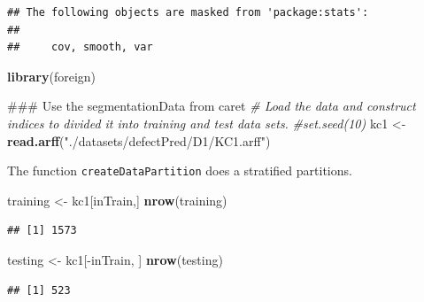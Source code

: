 \documentclass[]{book}
\newenvironment{Shaded}{\begin{snugshade}}{\end{snugshade}}
\newcommand{\KeywordTok}[1]{\textcolor[rgb]{0.13,0.29,0.53}{\textbf{{#1}}}}
\newcommand{\DataTypeTok}[1]{\textcolor[rgb]{0.13,0.29,0.53}{{#1}}}
\newcommand{\DecValTok}[1]{\textcolor[rgb]{0.00,0.00,0.81}{{#1}}}
\newcommand{\StringTok}[1]{\textcolor[rgb]{0.31,0.60,0.02}{{#1}}}
\newcommand{\CommentTok}[1]{\textcolor[rgb]{0.56,0.35,0.01}{\textit{{#1}}}}
\newcommand{\OtherTok}[1]{\textcolor[rgb]{0.56,0.35,0.01}{{#1}}}
\newcommand{\NormalTok}[1]{{#1}}
\begin{document}
\begin{verbatim}
## The following objects are masked from 'package:stats':
## 
##     cov, smooth, var
\end{verbatim}

\begin{Shaded}
\begin{Highlighting}[]
\KeywordTok{library}\NormalTok{(foreign)}

\NormalTok{### Use the segmentationData from caret}
\CommentTok{# Load the data and construct indices to divided it into training and test data sets.}
\CommentTok{#set.seed(10)}
\NormalTok{kc1 <-}\StringTok{ }\KeywordTok{read.arff}\NormalTok{(}\StringTok{"./datasets/defectPred/D1/KC1.arff"}\NormalTok{)}
\end{Highlighting}
\end{Shaded}

\begin{Shaded}
\end{Shaded}

The function \texttt{createDataPartition} does a stratified partitions.

\begin{Shaded}
\begin{Highlighting}[]
\NormalTok{training <-}\StringTok{ }\NormalTok{kc1[inTrain,]}
\KeywordTok{nrow}\NormalTok{(training)}
\end{Highlighting}
\end{Shaded}

\begin{verbatim}
## [1] 1573
\end{verbatim}

\begin{Shaded}
\begin{Highlighting}[]
\NormalTok{testing <-}\StringTok{ }\NormalTok{kc1[-inTrain, ]}
\KeywordTok{nrow}\NormalTok{(testing)}
\end{Highlighting}
\end{Shaded}

\begin{verbatim}
## [1] 523
\end{verbatim}
\end{document}
